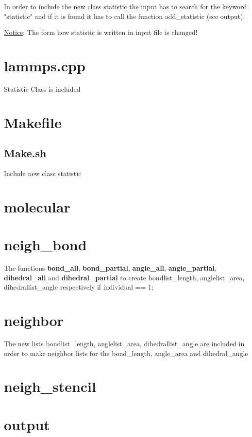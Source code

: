 In order to include the new class statistic the input has to search for the  keyword "statistic" and if it is found it has to call the function add\_statistic (see output).

\underline{Notice}: The form how statistic is written in input file is changed!


\section{lammps.cpp}

Statistic Class is included


\section{Makefile}


\subsection{Make.sh}

Include new class statistic


\section{molecular}


\section{neigh\_bond}

The functions \textbf{bond\_all}, \textbf{bond\_partial}, \textbf{angle\_all}, \textbf{angle\_partial}, \textbf{dihedral\_all} and \textbf{dihedral\_partial} to create bondlist\_length, anglelist\_area, dihedrallist\_angle respectively if individual == 1;


\section{neighbor}

The new lists bondlist\_length, anglelist\_area, dihedrallist\_angle are included in order to make neighbor lists for the bond\_length, angle\_area and dihedral\_angle


\section{neigh\_stencil}


\section{output}

